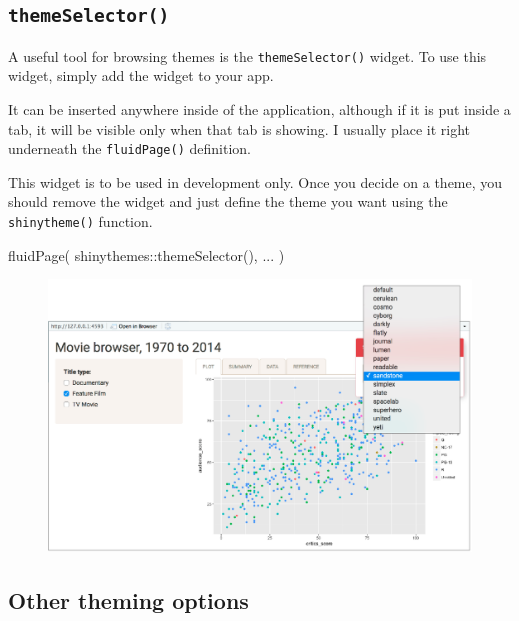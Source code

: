 \documentclass[
  letterpaper,
  DIV=11,
  numbers=noendperiod]{scrreprt}
\newenvironment{Shaded}{\begin{snugshade}}{\end{snugshade}}
\newcommand{\FunctionTok}[1]{\textcolor[rgb]{0.28,0.35,0.67}{#1}}
\newcommand{\NormalTok}[1]{\textcolor[rgb]{0.00,0.46,0.62}{#1}}
\newcommand{\SpecialCharTok}[1]{\textcolor[rgb]{0.37,0.37,0.37}{#1}}
\begin{document}
\hypertarget{themeselector}{%
\subsection{\texorpdfstring{\texttt{themeSelector()}}{themeSelector()}}\label{themeselector}}

A useful tool for browsing themes is the \texttt{themeSelector()}
widget. To use this widget, simply add the widget to your app.

It can be inserted anywhere inside of the application, although if it is
put inside a tab, it will be visible only when that tab is showing. I
usually place it right underneath the \texttt{fluidPage()} definition.

This widget is to be used in development only. Once you decide on a
theme, you should remove the widget and just define the theme you want
using the \texttt{shinytheme()} function.

\begin{Shaded}
\begin{Highlighting}[]
\FunctionTok{fluidPage}\NormalTok{(}
\NormalTok{  shinythemes}\SpecialCharTok{::}\FunctionTok{themeSelector}\NormalTok{(),}
\NormalTok{  ...}
\NormalTok{)}
\end{Highlighting}
\end{Shaded}

\begin{figure}

{\centering \includegraphics[width=1\textwidth,height=\textheight]{./images/themeselector.png}

}

\end{figure}

\hypertarget{other-theming-options}{%
\subsection{Other theming options}\label{other-theming-options}}
\end{document}
